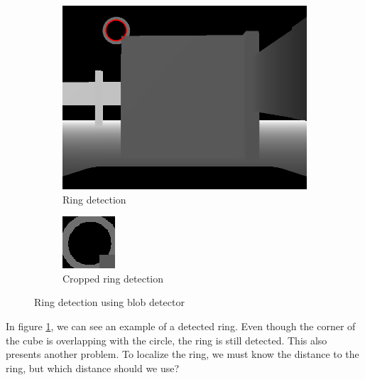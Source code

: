 \documentclass[12pt,a4paper]{article}
\begin{document}
	\begin{figure}[h]
		\begin{subfigure}{.5\textwidth}
			\centering
			\includegraphics[width=.8\linewidth]{images/ring_detection}
			\caption{Ring detection}
			\label{fig:detected_ring}
		\end{subfigure}
		\begin{subfigure}{.5\textwidth}
			\centering
			\includegraphics[width=.8\linewidth]{images/ring_detection_cropped}
			\caption{Cropped ring detection}
			\label{fig:detected_ring_cropped}
		\end{subfigure}
		\caption{Ring detection using blob detector}
		\label{fig:ring_detection}
	\end{figure}

	In figure \ref{fig:detected_ring}, we can see an example of a detected ring. Even though the corner of the cube is overlapping with the circle, the ring is still detected. This also presents another problem. To localize the ring, we must know the distance to the ring, but which distance should we use? \\
\end{document}
